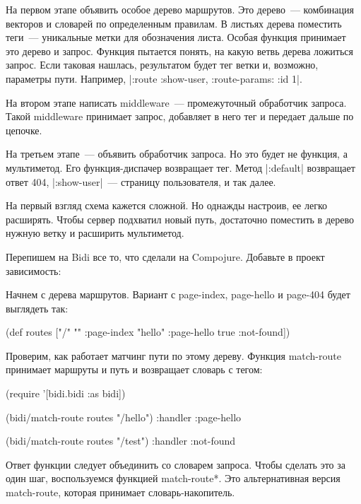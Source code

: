На первом этапе объявить особое дерево маршрутов. Это дерево~--- комбинация
векторов и словарей по определенным правилам. В листьях дерева поместить теги~---
уникальные метки для обозначения листа. Особая функция принимает это дерево и
запрос. Функция пытается понять, на какую ветвь дерева ложиться запрос. Если
таковая нашлась, результатом будет тег ветки и, возможно, параметры
пути. Например, \spverb|{:route :show-user, :route-params: {:id 1}}|.

На втором этапе написать middleware~--- промежуточный обработчик запроса. Такой
middleware принимает запрос, добавляет в него тег и передает дальше по цепочке.

На третьем этапе~--- объявить обработчик запроса. Но это будет не функция, а
мультиметод. Его функция-диспачер возвращает тег. Метод \spverb|:default| возвращает
ответ 404, \spverb|:show-user|~--- страницу пользователя, и так далее.

На первый взгляд схема кажется сложной. Но однажды настроив, ее легко
расширять. Чтобы сервер подхватил новый путь, достаточно поместить в дерево
нужную ветку и расширить мультиметод.

Перепишем на Bidi все то, что сделали на Compojure. Добавьте в проект
зависимость:

\begin{code}
[bidi "2.1.5"]
\end{code}

Начнем с дерева маршрутов. Вариант с page-index, page-hello и page-404 будет выглядеть так:

\begin{code}
(def routes
  ["/" {""      :page-index
        "hello" :page-hello
        true    :not-found}])
\end{code}

Проверим, как работает матчинг пути по этому дереву. Функция match-route
принимает маршруты и путь и возвращает словарь с тегом:

\begin{code}
(require '[bidi.bidi :as bidi])

(bidi/match-route routes "/hello")
{:handler :page-hello}

(bidi/match-route routes "/test")
{:handler :not-found}
\end{code}

Ответ функции следует объединить со словарем запроса. Чтобы сделать это за один
шаг, воспользуемся функцией match-route*. Это альтернативная версия match-route,
которая принимает словарь-накопитель.

